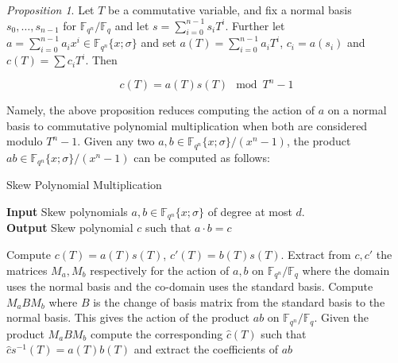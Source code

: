 \documentclass[9pt]{article}
\theoremstyle{plain}
\theoremstyle{definition}
\theoremstyle{remark}
\newtheorem*{proposition*}{Proposition}
\newcommand{\F}{\mathbb{F}}
\renewcommand{\L}{\F_{q^n}}
\begin{document}
\begin{proposition*}{\cite[Prop. 1.6]{CaLe17}}
Let $T$ be a commutative variable, and fix a normal basis $s_0, \ldots, s_{n-1}$ for $\F_{q^n}/\F_q$ and let $s = \sum_{i=0}^{n-1} s_i T^i$. Further let $a = \sum_{i=0}^{n-1} a_i x^i\in \F_{q^n}\{x; \sigma\}$ and set $a(T) = \sum_{i=0}^{n-1} a_i T^i$, $c_i = a(s_i)$ and $c(T) = \sum c_iT^i$. Then

\begin{equation*}
    c(T) = a(T)s(T) \mod T^n -1
\end{equation*}

\end{proposition*}

Namely, the above proposition reduces computing the action of $a$ on a normal basis to commutative polynomial multiplication when both are considered modulo $T^n - 1$. Given any two $a, b \in \F_{q^n}\{x; \sigma\}/(x^n - 1)$, the product $ab \in \F_{q^n}\{x; \sigma\}/(x^n - 1)$ can be computed as follows:


\begin{algorithm}
\caption{Skew Polynomial Multiplication \cite{CaLe17}}
\label{smult2}
\hspace*{\algorithmicindent} \textbf{Input} Skew polynomials $a, b \in \F_{q^n}\{x; \sigma\}$ of degree at most $d$. \\
 \hspace*{\algorithmicindent} \textbf{Output} Skew polynomial $c$ such that $a \cdot b = c$ \\
 \begin{algorithmic}[1]
    \State Compute $c(T) = a(T) s(T)$, $c'(T) = b(T)s(T)$.
    \State Extract from $c,c'$ the matrices $M_a,M_b$ respectively for the action of $a, b$ on $\F_{q^n}/\F_q$ where the domain uses the normal basis and the co-domain uses the standard basis.
    \State Compute $M_a B M_b$ where $B$ is the change of basis matrix from the standard basis to the normal basis. This gives the action of the product $ab$ on $\F_{q^n}/\F_q$.
    \State Given the product $M_aBM_b$ compute the corresponding $\hat{c}(T)$ such that $\hat{c}s^{-1}(T) = a(T)b(T)$ and extract the coefficients of $ab$
 \end{algorithmic}
\end{algorithm}

\end{document}
